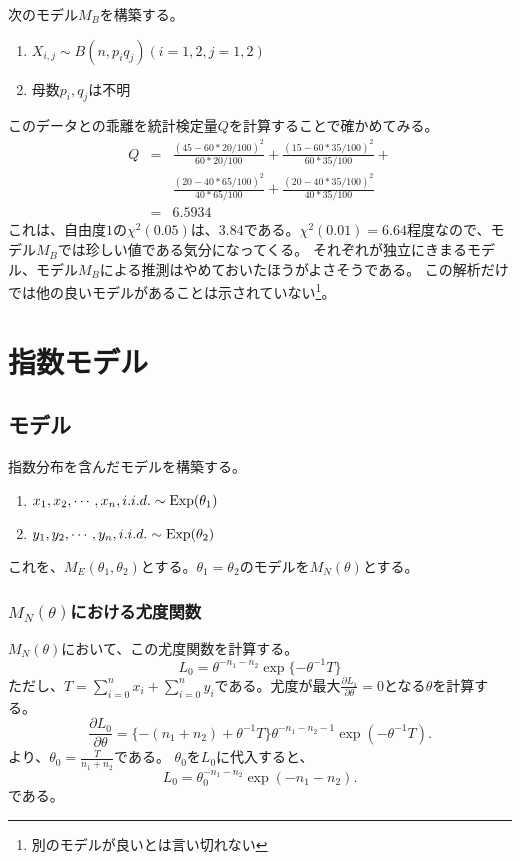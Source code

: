 次のモデル$M_B$を構築する。
\begin{enumerate}
 \item $X_{i,j} \sim B(n,p_i q_j) (i=1,2,j=1,2)$
 \item 母数$p_i,q_j$は不明
\end{enumerate}
このデータとの乖離を統計検定量$Q$を計算することで確かめてみる。
\begin{eqnarray*}
 Q &=& \frac{(45-60*20/100)^2}{60*20/100} +\frac{(15-60*35/100)^2}{60*35/100} + \\
&&\frac{(20-40*65/100)^2}{40*65/100} + 
\frac{(20-40*35/100)^2}{40*35/100} \\
&=& 6.5934
\end{eqnarray*}
これは、自由度$1$の$\chi^2(0.05)$は、$3.84$である。$\chi^2(0.01)=6.64$程度なので、モデル$M_B$では珍しい値である気分になってくる。
それぞれが独立にきまるモデル、モデル$M_B$による推測はやめておいたほうがよさそうである。
この解析だけでは他の良いモデルがあることは示されていない\footnote{別のモデルが良いとは言い切れない}。

\begin{comment}
 = (45-60*65/100)^2/(60*65/100)+(15-60*35/100)^2/(60*35/100)+(20-40*65/100)^2/(40*65/100) + (20-40*35/100)^2/(40*35/100)
 = 6.5934
\end{comment}

\section{指数モデル}
\subsection{モデル}
指数分布を含んだモデルを構築する。
\begin{enumerate}
 \item $x_1,x_2,\cdots,x_n,i.i.d. \sim \rm{Exp}(\theta_1)$
 \item $y_1,y_2,\cdots,y_n,i.i.d. \sim \rm{Exp}(\theta_2)$
\end{enumerate}
これを、$M_E(\theta_1,\theta_2)$とする。$\theta_1=\theta_2$のモデルを$M_N(\theta)$とする。
\subsubsection{$M_N(\theta)$における尤度関数}
$M_N(\theta)$において、この尤度関数を計算する。
\begin{equation*}
 L_{0} = \theta^{-n_1-n_2}\exp\{-\theta^{-1}T\}
\end{equation*}
ただし、$T=\sum_{i=0}^n x_i+\sum_{i=0}^n y_i$である。尤度が最大$\frac{\partial L_1}{\partial\theta}=0$となる$\theta$を計算する。
\begin{equation}
    \frac{\partial L_0}{\partial\theta} = \{ -(n_1+n_2)+\theta^{-1}T \}\theta^{-n_1-n_2-1}\exp(-\theta^{-1}T).
\end{equation}
より、$\theta_0=\frac{T}{n_1+n_2}$である。
$\theta_0$を$L_{0}$に代入すると、
\begin{equation}
    L_{0} = \theta_0^{-n_1-n_2}\exp(-n_1-n_2).
\end{equation}
である。

